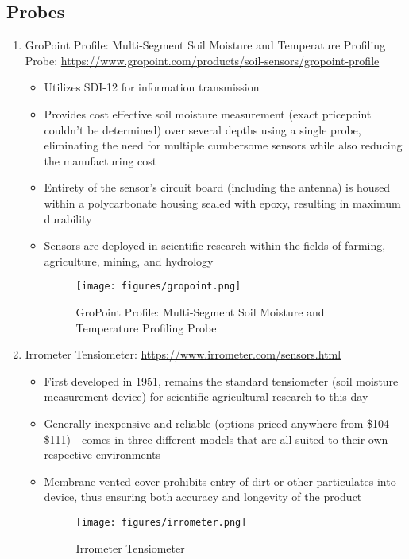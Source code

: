 \documentclass{article}
\begin{document}
\subsection{Probes}
\begin{enumerate}
\item GroPoint Profile: Multi-Segment Soil Moisture and Temperature Profiling Probe: \url{https://www.gropoint.com/products/soil-sensors/gropoint-profile}

\begin{itemize}
    \item Utilizes SDI-12 for information transmission
    \item Provides cost effective soil moisture measurement (exact pricepoint couldn't be determined) over several depths using a single probe, eliminating the need for multiple cumbersome sensors while also reducing the manufacturing cost
    \item Entirety of the sensor's circuit board (including the antenna) is housed within a polycarbonate housing sealed with epoxy, resulting in maximum durability
    \item Sensors are deployed in scientific research within the fields of farming, agriculture, mining, and hydrology
    
\begin{figure}[htp]
    \centering
    \texttt{[image: figures/gropoint.png]}
    \caption{GroPoint Profile: Multi-Segment Soil Moisture and Temperature Profiling Probe}
\end{figure}

\end{itemize}

\item Irrometer Tensiometer: \url{https://www.irrometer.com/sensors.html}
\begin{itemize}
    \item First developed in 1951, remains the standard tensiometer (soil moisture measurement device) for scientific agricultural research to this day
    \item Generally inexpensive and reliable (options priced anywhere from \$104 - \$111) - comes in three different models that are all suited to their own respective environments 
    \item Membrane-vented cover prohibits entry of dirt or other particulates into device, thus ensuring both accuracy and longevity of the product
    
\begin{figure}[htp]
    \centering
    \texttt{[image: figures/irrometer.png]}
    \caption{Irrometer Tensiometer}
\end{figure}

\end{itemize}

\end{enumerate}
\end{document}
